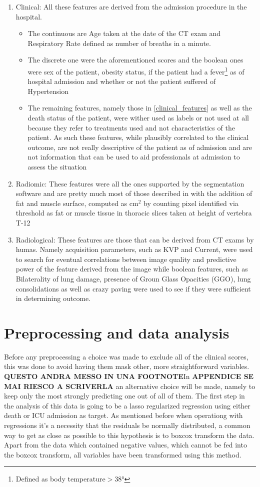\begin{enumerate}
\item Clinical: All these features are derived from the admission procedure in the hospital. 
	\begin{itemize}
		\item The continuous are Age taken at the date of the CT exam and Respiratory Rate defined as number of breaths in a minute.
		\item The discrete one were the aforementioned scores and the boolean ones were sex of the patient, obesity status, if the patient had a fever\footnote{Defined as body temperature$>$38°} as of hospital admission and whether or not the patient suffered of Hypertension
		\item The remaining features, namely those in \ref{clinical_features} as well as the death status of the patient, were wither used as labels or not used at all because they refer to treatments used and not characteristics of the patient. As such these features, while plausibly correlated to the clinical outcome, are not really descriptive of the patient as of admission and are not information that can be used to aid professionals at admission to assess the situation
	\end{itemize}
\item Radiomic: These features were all the ones supported by the segmentation software and are pretty much most of those described in \cite{IBSI} with the addition of fat and muscle surface, computed as cm$^2$ by counting pixel identified via threshold as fat or muscle tissue in thoracic slices taken at height of vertebra T-12
\item Radiological: These features are those that can be derived from CT exams by humas. Namely acquisition parameters, such as KVP and Current, were used to search for eventual correlations between image quality and predictive power of the feature derived from the image while boolean features, such as Bilaterality of lung damage, presence of Groun Glass Opacities (GGO), lung consolidations as well as crazy paving were used to see if they were sufficient in determining outcome.
\end{enumerate}

\section{Preprocessing and data analysis}
Before any preprocessing a choice was made to exclude all of the clinical scores, this was done to avoid having them mask other, more straightforward variables. \textbf{QUESTO ANDRA MESSO IN UNA FOOTNOTE}In \textbf{APPENDICE SE MAI RIESCO A SCRIVERLA} an alternative choice will be made, namely to keep only the most strongly predicting one out of all of them.
The first step in the analysis of this data is going to be a lasso regularized regression using either death or ICU admission as target. As mentioned before when operationg with regressions it's a necessity that the residuals be normally distributed, a common way to get as close as possible to this hypothesis is to boxcox transform the data. Apart from the data which contained negative values, which cannot be fed into the boxcox transform, all variables have been transformed using this method.

